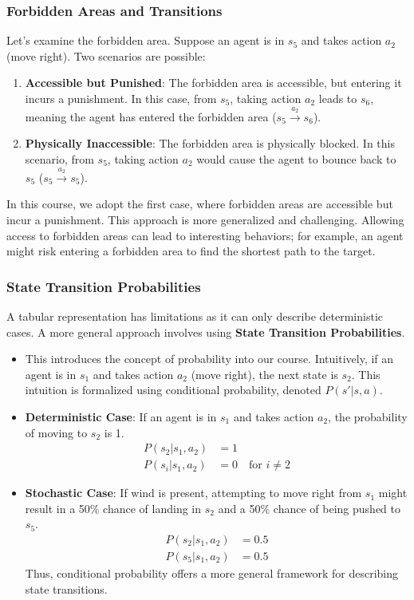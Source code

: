 \documentclass{article}
\begin{document}
\subsubsection*{Forbidden Areas and Transitions}
Let's examine the forbidden area. Suppose an agent is in $s_5$ and takes action $a_2$ (move right). Two scenarios are possible:
\begin{enumerate}[noitemsep]
    \item \textbf{Accessible but Punished}: The forbidden area is accessible, but entering it incurs a punishment. In this case, from $s_5$, taking action $a_2$ leads to $s_6$, meaning the agent has entered the forbidden area ($s_5 \xrightarrow{a_2} s_6$).
    \item \textbf{Physically Inaccessible}: The forbidden area is physically blocked. In this scenario, from $s_5$, taking action $a_2$ would cause the agent to bounce back to $s_5$ ($s_5 \xrightarrow{a_2} s_5$).
\end{enumerate}
In this course, we adopt the first case, where forbidden areas are accessible but incur a punishment. This approach is more generalized and challenging. Allowing access to forbidden areas can lead to interesting behaviors; for example, an agent might risk entering a forbidden area to find the shortest path to the target.

\subsubsection*{State Transition Probabilities}
A tabular representation has limitations as it can only describe deterministic cases. A more general approach involves using \textbf{State Transition Probabilities}.
\begin{itemize}[noitemsep]
    \item This introduces the concept of probability into our course. Intuitively, if an agent is in $s_1$ and takes action $a_2$ (move right), the next state is $s_2$. This intuition is formalized using conditional probability, denoted $P(s' | s, a)$.
    \item \textbf{Deterministic Case}: If an agent is in $s_1$ and takes action $a_2$, the probability of moving to $s_2$ is 1.
        \begin{align*}
            P(s_2 | s_1, a_2) &= 1 \\
            P(s_i | s_1, a_2) &= 0 \quad \text{for } i \neq 2
        \end{align*}
    \item \textbf{Stochastic Case}: If wind is present, attempting to move right from $s_1$ might result in a 50\% chance of landing in $s_2$ and a 50\% chance of being pushed to $s_5$.
        \begin{align*}
            P(s_2 | s_1, a_2) &= 0.5 \\
            P(s_5 | s_1, a_2) &= 0.5
        \end{align*}
        Thus, conditional probability offers a more general framework for describing state transitions.
\end{itemize}
\end{document}
